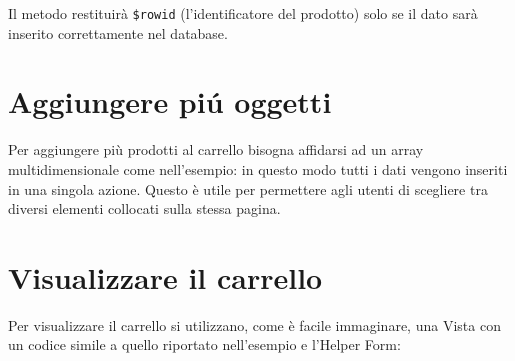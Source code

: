 Il metodo  restituirà \verb|$rowid| (l'identificatore del prodotto) solo se il dato sarà inserito correttamente nel database.

\section*{Aggiungere pi\'u oggetti}
Per aggiungere più prodotti al carrello bisogna affidarsi ad un array multidimensionale come nell'esempio: in questo modo tutti i dati vengono inseriti in una singola azione. Questo è utile per permettere agli utenti di scegliere tra diversi elementi collocati sulla stessa pagina.


\label{sec:vedicarrello}
\section*{Visualizzare il carrello}
Per visualizzare il carrello si utilizzano, come è facile immaginare, una Vista con un codice simile a quello riportato nell'esempio e l'Helper Form:

